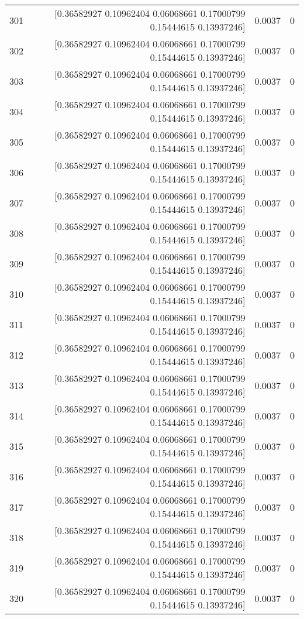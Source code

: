 \begin{longtable}{lrrr}
301 & [0.36582927 0.10962404 0.06068661 0.17000799 0.15444615 0.13937246] & 0.0037 & 0 \\
302 & [0.36582927 0.10962404 0.06068661 0.17000799 0.15444615 0.13937246] & 0.0037 & 0 \\
303 & [0.36582927 0.10962404 0.06068661 0.17000799 0.15444615 0.13937246] & 0.0037 & 0 \\
304 & [0.36582927 0.10962404 0.06068661 0.17000799 0.15444615 0.13937246] & 0.0037 & 0 \\
305 & [0.36582927 0.10962404 0.06068661 0.17000799 0.15444615 0.13937246] & 0.0037 & 0 \\
306 & [0.36582927 0.10962404 0.06068661 0.17000799 0.15444615 0.13937246] & 0.0037 & 0 \\
307 & [0.36582927 0.10962404 0.06068661 0.17000799 0.15444615 0.13937246] & 0.0037 & 0 \\
308 & [0.36582927 0.10962404 0.06068661 0.17000799 0.15444615 0.13937246] & 0.0037 & 0 \\
309 & [0.36582927 0.10962404 0.06068661 0.17000799 0.15444615 0.13937246] & 0.0037 & 0 \\
310 & [0.36582927 0.10962404 0.06068661 0.17000799 0.15444615 0.13937246] & 0.0037 & 0 \\
311 & [0.36582927 0.10962404 0.06068661 0.17000799 0.15444615 0.13937246] & 0.0037 & 0 \\
312 & [0.36582927 0.10962404 0.06068661 0.17000799 0.15444615 0.13937246] & 0.0037 & 0 \\
313 & [0.36582927 0.10962404 0.06068661 0.17000799 0.15444615 0.13937246] & 0.0037 & 0 \\
314 & [0.36582927 0.10962404 0.06068661 0.17000799 0.15444615 0.13937246] & 0.0037 & 0 \\
315 & [0.36582927 0.10962404 0.06068661 0.17000799 0.15444615 0.13937246] & 0.0037 & 0 \\
316 & [0.36582927 0.10962404 0.06068661 0.17000799 0.15444615 0.13937246] & 0.0037 & 0 \\
317 & [0.36582927 0.10962404 0.06068661 0.17000799 0.15444615 0.13937246] & 0.0037 & 0 \\
318 & [0.36582927 0.10962404 0.06068661 0.17000799 0.15444615 0.13937246] & 0.0037 & 0 \\
319 & [0.36582927 0.10962404 0.06068661 0.17000799 0.15444615 0.13937246] & 0.0037 & 0 \\
320 & [0.36582927 0.10962404 0.06068661 0.17000799 0.15444615 0.13937246] & 0.0037 & 0 \\

\end{longtable}
